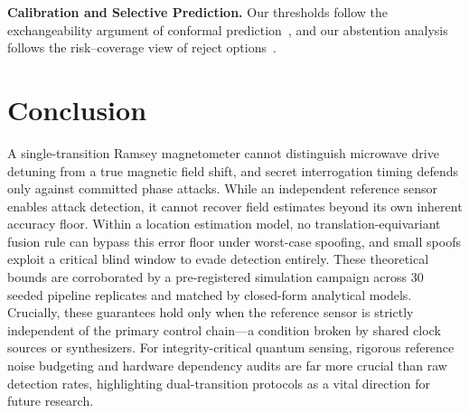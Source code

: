 \documentclass[conference]{IEEEtran}
\begin{document}
\textbf{Calibration and Selective Prediction.} Our thresholds follow the exchangeability argument of conformal prediction~\cite{angelopoulos2023conformal}, and our abstention analysis follows the risk--coverage view of reject options~\cite{chow1970reject,geifman2017selective}.


\balance
\section{Conclusion}
\label{sec:conclusion}

A single-transition Ramsey magnetometer cannot distinguish microwave drive detuning from a true magnetic field shift, and secret interrogation timing defends only against committed phase attacks. While an independent reference sensor enables attack detection, it cannot recover field estimates beyond its own inherent accuracy floor. Within a location estimation model, no translation-equivariant fusion rule can bypass this error floor under worst-case spoofing, and small spoofs exploit a critical blind window to evade detection entirely. These theoretical bounds are corroborated by a pre-registered simulation campaign across 30 seeded pipeline replicates and matched by closed-form analytical models. Crucially, these guarantees hold only when the reference sensor is strictly independent of the primary control chain—a condition broken by shared clock sources or synthesizers. For integrity-critical quantum sensing, rigorous reference noise budgeting and hardware dependency audits are far more crucial than raw detection rates, highlighting dual-transition protocols as a vital direction for future research.



\end{document}
